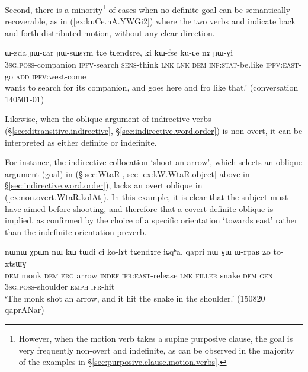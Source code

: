 Second, there is a minority\footnote{However, when the motion verb takes a supine purposive clause, the goal is very frequently non-overt and indefinite, as can be observed in the majority of the examples in §\ref{sec:purposive.clause.motion.verbs}.  } of cases when no definite goal can be semantically recoverable, as in (\ref{ex:kuCe.nA.YWGi2}) where the two verbs  and  indicate back and forth distributed motion, without any clear direction.

\begin{exe}
\ex \label{ex:kuCe.nA.YWGi2}
\gll ɯ-zda ɲɯ-ɕar ɲɯ-sɯsɤm  tɕe tɕendɤre, ki kɯ-fse ku-ɕe nɤ ɲɯ-ɣi \\
\textsc{3sg}.\textsc{poss}-companion \textsc{ipfv}-search \textsc{sens}-think \textsc{lnk} \textsc{lnk} \textsc{dem} \textsc{inf}:\textsc{stat}-be.like \textsc{ipfv}:\textsc{east}-go \textsc{add} \textsc{ipfv}:west-come \\
 wants to search for its companion, and goes here and fro like that.' (conversation 140501-01)
\end{exe}

Likewise, when the oblique argument of indirective verbs (§\ref{sec:ditransitive.indirective}, §\ref{sec:indirective.word.order}) is non-overt, it can be interpreted as either definite or indefinite.

For instance, the indirective collocation  `shoot an arrow', which selects an oblique argument (goal) in  (§\ref{sec:WtaR}, see \ref{ex:kW.WtaR.object} above in §\ref{sec:indirective.word.order}), lacks an overt oblique in (\ref{ex:non.overt.WtaR.kolAt}). In this example, it is clear that the subject must have aimed before shooting, and therefore that a covert definite oblique is implied, as confirmed by the choice of a specific orientation `towards east' rather than the indefinite orientation preverb.

\begin{exe}
\ex \label{ex:non.overt.WtaR.kolAt}
\gll  nɯnɯ χpɯn nɯ kɯ tɯdi ci ko-lɤt tɕendɤre iɕqʰa,  qapri nɯ ɣɯ ɯ-rpaʁ ʑo to-xtsɯɣ \\
\textsc{dem} monk \textsc{dem} \textsc{erg} arrow \textsc{indef} \textsc{ifr}:\textsc{east}-release \textsc{lnk} \textsc{filler} snake \textsc{dem} \textsc{gen} \textsc{3sg}.\textsc{poss}-shoulder \textsc{emph} \textsc{ifr}-hit \\
\glt `The monk shot an arrow, and it hit the snake in the shoulder.' (150820 qaprANar)
\end{exe}

